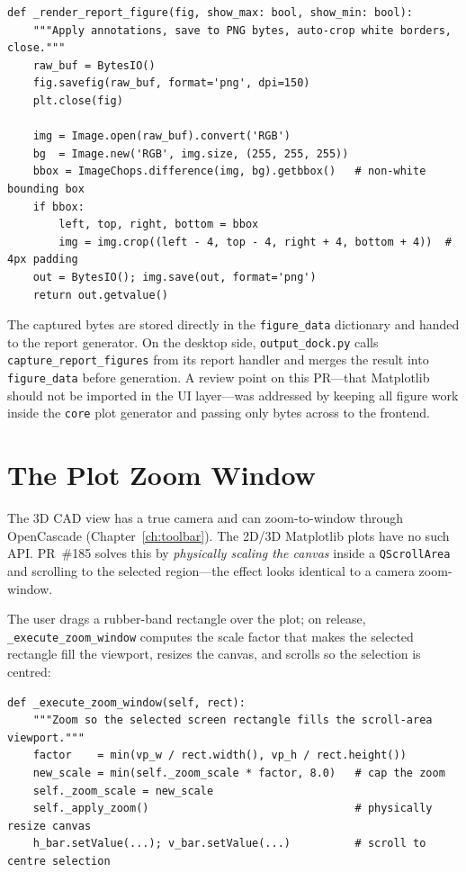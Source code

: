 \begin{lstlisting}[caption={Rendering to PNG bytes with automatic white-border cropping (\texttt{plot\_generator.py}).},label={lst:crop}]
def _render_report_figure(fig, show_max: bool, show_min: bool):
    """Apply annotations, save to PNG bytes, auto-crop white borders, close."""
    raw_buf = BytesIO()
    fig.savefig(raw_buf, format='png', dpi=150)
    plt.close(fig)

    img = Image.open(raw_buf).convert('RGB')
    bg  = Image.new('RGB', img.size, (255, 255, 255))
    bbox = ImageChops.difference(img, bg).getbbox()   # non-white bounding box
    if bbox:
        left, top, right, bottom = bbox
        img = img.crop((left - 4, top - 4, right + 4, bottom + 4))  # 4px padding
    out = BytesIO(); img.save(out, format='png')
    return out.getvalue()
\end{lstlisting}

The captured bytes are stored directly in the \texttt{figure\_data} dictionary and handed to the
report generator. On the desktop side, \texttt{output\_dock.py} calls
\texttt{capture\_report\_figures} from its report handler and merges the result into
\texttt{figure\_data} before generation. A review point on this PR---that Matplotlib should not
be imported in the UI layer---was addressed by keeping all figure work inside the
\texttt{core} plot generator and passing only bytes across to the frontend.

\section{The Plot Zoom Window}
The 3D CAD view has a true camera and can zoom-to-window through OpenCascade
(Chapter~\ref{ch:toolbar}). The 2D/3D Matplotlib plots have no such API. PR~\#185 solves this by
\emph{physically scaling the canvas} inside a \texttt{QScrollArea} and scrolling to the selected
region---the effect looks identical to a camera zoom-window.

The user drags a rubber-band rectangle over the plot; on release, \texttt{\_execute\_zoom\_window}
computes the scale factor that makes the selected rectangle fill the viewport, resizes the
canvas, and scrolls so the selection is centred:

\begin{lstlisting}[caption={Zoom-to-window by scaling the canvas in a scroll area (\texttt{mpl\_plot\_widget.py}).},label={lst:zoomwin}]
def _execute_zoom_window(self, rect):
    """Zoom so the selected screen rectangle fills the scroll-area viewport."""
    factor    = min(vp_w / rect.width(), vp_h / rect.height())
    new_scale = min(self._zoom_scale * factor, 8.0)   # cap the zoom
    self._zoom_scale = new_scale
    self._apply_zoom()                                # physically resize canvas
    h_bar.setValue(...); v_bar.setValue(...)          # scroll to centre selection
\end{lstlisting}


